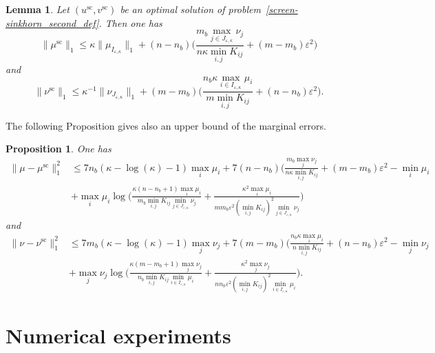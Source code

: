 \documentclass{article}
\newtheorem{lemma}{Lemma}
\newtheorem{proposition}{Proposition}
\newcommand{\norm}[1]{\|#1\|}
\begin{document}
\begin{lemma}
\label{lemma_bounds_on_marginals}
Let $(u^{\text{sc}}, v^{\text{sc}})$ be an optimal solution of problem~\eqref{screen-sinkhorn_second_def}.
Then one has 
\begin{equation*}
\norm{\mu^{\text{sc}}}_1 \leq \kappa \norm{\mu_{I_{\varepsilon,\kappa}}^{\text{}}}_1 + (n-n_b) \Big(\frac{m_b\max_{j \in J_{\varepsilon,\kappa}} \nu_j}{n\kappa\min_{i,j}K_{ij}} + (m-m_b)\varepsilon^2 \Big)
\end{equation*}
and 
\begin{equation*}
\norm{\nu^{\text{sc}}}_1 \leq \kappa^{-1} \norm{\nu_{J_{\varepsilon,\kappa}}}_1 + (m-m_b)\Big(\frac{n_b\kappa \max_{i\in I_{\varepsilon,\kappa}}\mu_i}{m\min_{i,j}K_{ij}} + (n-n_b)\varepsilon^2\Big).
\end{equation*}
\end{lemma}
The following Proposition gives also an upper bound of the marginal errors.
\begin{proposition}
\label{proposition_error_in_marginals}
One has 
\begin{align*} %
{\norm{{\mu} -{\mu}^{\text{sc}}}^2_1}&\leq 7n_b(\kappa-\log(\kappa)-1)\max_{i} \mu_i + 7 (n-n_b)\bigg(\frac{m_b\max_{j}\nu_j}{n\kappa\min_{i,j} K_{ij}} + (m- m_b) \varepsilon^2 - \min_{i}\mu_i\\
&+ \max_{i} \mu_i\log\Big(\frac{\kappa(n-n_b+ 1)\max_{i} \mu_i}{m_b\min_{i,j}K_{ij}\min_{j \in J_{\varepsilon,\kappa}}\nu_j} + \frac{\kappa^2\max_{i} \mu_i}{mm_b\varepsilon^2(\min_{i,j}K_{ij})^2\min_{j \in J_{\varepsilon,\kappa}}\nu_j}\Big)%
\end{align*}
and 
\begin{align*} %
{\norm{{\nu} -{\nu}^{\text{sc}}}^2_1} &\leq 7m_b(\kappa-\log(\kappa)-1)\max_{j} \nu_j + 7(m-m_b)\bigg(\frac{n_b\kappa\max_{i}\mu_i}{n\min_{i,j} K_{ij}} + (n- n_b) \varepsilon^2 - \min_{j}\nu_j\\
&+ \max_{j} \nu_j\log\Big(\frac{\kappa(m-m_b+ 1)\max_{j} \nu_j}{n_b\min_{i,j}K_{ij}\min_{i \in I_{\varepsilon,\kappa}}\mu_i} + \frac{\kappa^2\max_{j} \nu_j}{nn_b\varepsilon^2(\min_{i,j}K_{ij})^2\min_{i \in I_{\varepsilon,\kappa}}\mu_i}\Big).%
\end{align*}


\end{proposition}

\section{Numerical experiments}
\label{sec:numerical_experiments}




\small


\end{document}
